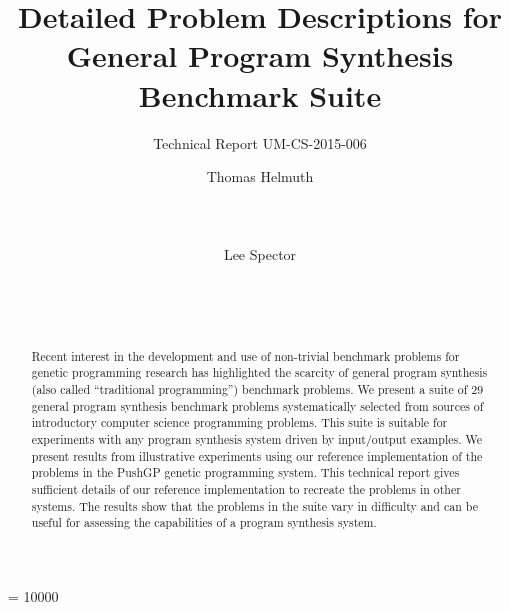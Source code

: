 \documentclass{sig-alternate}
\begin{document}
%


\widowpenalty = 10000

\title{Detailed Problem Descriptions for General Program Synthesis Benchmark Suite}

\subtitle{Technical Report UM-CS-2015-006}


\author{
\alignauthor
Thomas Helmuth\\
       \\
       \\
       \\
\alignauthor
Lee Spector\\
       \\
       \\
       \\
}

\maketitle

\begin{abstract}
Recent interest in the development and use of non-trivial benchmark problems for genetic programming research has highlighted the scarcity of general program synthesis (also called ``traditional programming'') benchmark problems. We present a suite of $29$ general program synthesis benchmark problems systematically selected from sources of introductory computer science programming problems. This suite is suitable for experiments with any program synthesis system driven by input/output examples. We present results from illustrative experiments using our reference implementation of the problems in the PushGP genetic programming system. This technical report gives sufficient details of our reference implementation to recreate the problems in other systems. The results show that the problems in the suite vary in difficulty and can be useful for assessing the capabilities of a program synthesis system.
\end{abstract}
\end{document}
